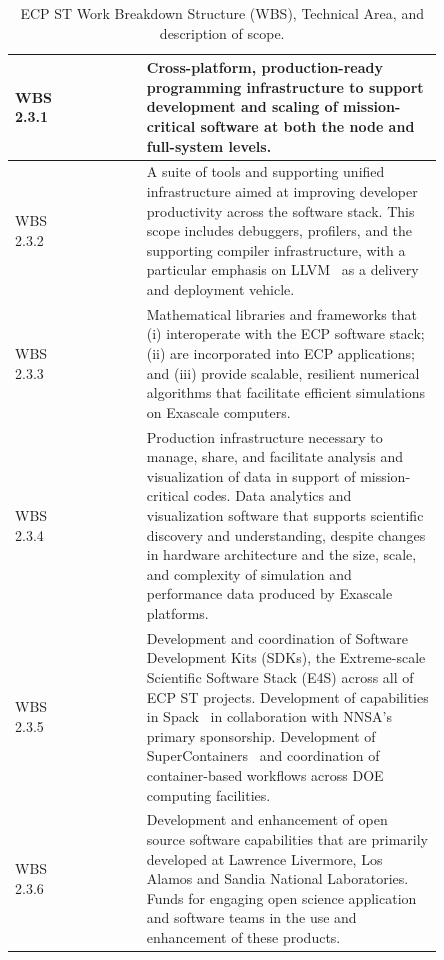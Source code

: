 \begin{table}
	\begin{tabular}{|>{\columncolor[gray]{0.8}}p{0.10\linewidth}|>{\columncolor[rgb]{0.88,1,1}}p{0.15\linewidth}|p{0.6\linewidth}|}\hline
	    \vfill WBS 2.3.1\vfill & \vfill \centering{Programming Models and Runtimes} \vfill & \vfill Cross-platform, production-ready programming infrastructure to support development and scaling of mission-critical software at both the node and full-system levels.\vfill \\\hline
		\vfill WBS 2.3.2 \vfill & \vfill \centering{Development Tools} \vfill & \vfill A suite of tools and supporting unified infrastructure aimed at improving developer productivity across the software stack. This scope includes debuggers, profilers, and the supporting compiler infrastructure, with a particular emphasis on LLVM~\cite{LLVM:2018} as a delivery and deployment vehicle. \vfill \\\hline
		\vfill WBS 2.3.3 \vfill & \vfill \centering{Mathematical Libraries} \vfill & \vfill Mathematical libraries and frameworks that (i) interoperate with the ECP software stack; (ii) are incorporated into ECP applications; and (iii) provide scalable, resilient numerical algorithms that facilitate efficient simulations on Exascale computers.\vfill \\\hline
		\vfill WBS 2.3.4 \vfill & \vfill \centering{Data and Visualization} \vfill & \vfill Production infrastructure necessary to manage, share, and facilitate analysis and visualization of data in support of mission-critical codes. Data analytics and visualization software that supports scientific discovery and understanding, despite changes in hardware architecture and the size, scale, and complexity of simulation and performance data produced by Exascale platforms. \vfill \\\hline
		\vfill WBS 2.3.5 \vfill & \vfill \centering{Software Ecosystem and Delivery} \vfill & \vfill Development and coordination of Software Development Kits (SDKs), the Extreme-scale Scientific Software Stack (E4S) across all of ECP ST projects.  Development of capabilities in Spack~\cite{gamblin+:sc15} in collaboration with NNSA's primary sponsorship.  Development of SuperContainers~\cite{Supercontainers} and coordination of container-based workflows across DOE computing facilities.\vfill \\\hline
		\vfill WBS 2.3.6 \vfill & \vfill \centering{NNSA ST} \vfill & \vfill Development and enhancement of open source software capabilities that are primarily developed at Lawrence Livermore, Los Alamos and Sandia National Laboratories.  Funds for engaging open science application and software teams in the use and enhancement of these products.\vfill \\\hline
	\end{tabular}
	\caption{\label{table:wbs} ECP ST Work Breakdown Structure (WBS), Technical Area, and description of scope.}
\end{table}

